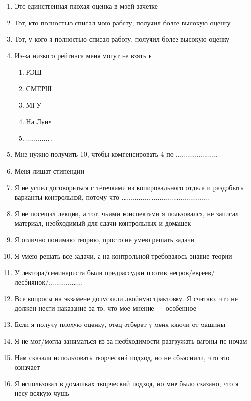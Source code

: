 \documentclass[12pt, a4paper]{article}\usepackage[]{graphicx}\usepackage[]{color}
\begin{document}
\begin{enumerate}
\item Это единственная плохая оценка в моей зачетке
\item Тот, кто полностью списал мою работу, получил более высокую оценку
\item Тот, у кого я полностью списал работу, получил более высокую оценку
\item Из-за низкого рейтинга меня могут не взять в
\begin{enumerate}
\item РЭШ
\item СМЕРШ
\item МГУ
\item На Луну
\item ..............
\end{enumerate}
\item Мне нужно получить 10, чтобы компенсировать 4 по ......................
\item Меня лишат стипендии
\item Я не успел договориться с тётечками из копировального отдела и раздобыть варианты контрольной, потому что ..............................................
\item Я не посещал лекции, а тот, чьими конспектами я пользовался, не записал материал, необходимый для сдачи контрольных и домашек
\item Я отлично понимаю теорию, просто не умею решать задачи
\item Я умею решать все задачи, а на контрольной требовалось знание теории
\item У лектора/семинариста были предрассудки против негров/евреев/лесбиянок/..................
\item Все вопросы на экзамене допускали двойную трактовку. Я считаю, что не должен нести наказание за то, что мое мнение — особенное
\item Если я получу плохую оценку, отец отберет у меня ключи от машины
\item Я не мог/могла заниматься из-за необходимости разгружать вагоны по ночам
\item Нам сказали использовать творческий подход, но не объяснили, что это означает
\item Я использовал в домашках творческий подход,  но мне было сказано, что я несу всякую чушь

\end{enumerate}
\end{document}
